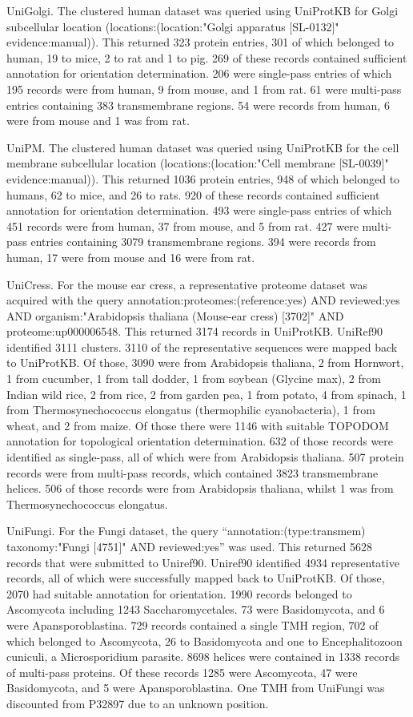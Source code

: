 UniGolgi. The clustered human dataset was queried using UniProtKB for Golgi subcellular location (locations:(location:"Golgi apparatus [SL-0132]" evidence:manual)). This returned 323 protein entries, 301 of which belonged to human, 19 to mice, 2 to rat and 1 to pig. 269 of these records contained sufficient annotation for orientation determination. 206 were single-pass entries of which 195 records were from human, 9 from mouse, and 1 from rat. 61 were multi-pass entries containing 383 transmembrane regions. 54 were records from human, 6 were from mouse and 1 was from rat.

UniPM. The clustered human dataset was queried using UniProtKB for the cell membrane subcellular location (locations:(location:"Cell membrane [SL-0039]" evidence:manual)). This returned 1036 protein entries, 948 of which belonged to humans, 62 to mice, and 26 to rats. 920 of these records contained sufficient annotation for orientation determination. 493 were single-pass entries of which 451 records were from human, 37 from mouse, and 5 from rat. 427 were multi-pass entries containing 3079 transmembrane regions. 394 were records from human, 17 were from mouse and 16 were from rat.

UniCress. For the mouse ear cress, a representative proteome dataset was acquired with the query annotation:proteomes:(reference:yes) AND reviewed:yes AND organism:"Arabidopsis thaliana (Mouse-ear cress) [3702]" AND proteome:up000006548. This returned 3174 records in UniProtKB. UniRef90 identified 3111 clusters. 3110 of the representative sequences were mapped back to UniProtKB. Of those, 3090 were from Arabidopsis thaliana, 2 from Hornwort, 1 from cucumber, 1 from tall dodder, 1 from soybean (Glycine max), 2 from Indian wild rice, 2 from rice, 2 from garden pea, 1 from potato, 4 from spinach, 1 from Thermosynechococcus elongatus (thermophilic cyanobacteria), 1 from wheat, and 2 from maize. Of those there were 1146 with suitable TOPO\textunderscore DOM annotation for topological orientation determination. 632 of those records were identified as single-pass, all of which were from Arabidopsis thaliana. 507 protein records were from multi-pass records, which contained 3823 transmembrane helices. 506 of those records were from Arabidopsis thaliana, whilst 1 was from Thermosynechococcus elongatus.

UniFungi. For the Fungi dataset, the query “annotation:(type:transmem) taxonomy:"Fungi [4751]" AND reviewed:yes” was used. This returned 5628 records that were submitted to Uniref90. Uniref90 identified 4934 representative records, all of which were successfully mapped back to UniProtKB. Of those, 2070 had suitable annotation for orientation. 1990 records belonged to Ascomycota including 1243 Saccharomycetales. 73 were Basidomycota, and 6 were Apansporoblastina. 729 records contained a single TMH region, 702 of which belonged to Ascomycota, 26 to Basidomycota and one to Encephalitozoon cuniculi, a Microsporidium parasite. 8698 helices were contained in 1338 records of multi-pass proteins. Of these records 1285 were Ascomycota, 47 were Basidomycota, and 5 were Apansporoblastina. One TMH from UniFungi was discounted from P32897 due to an unknown position.

